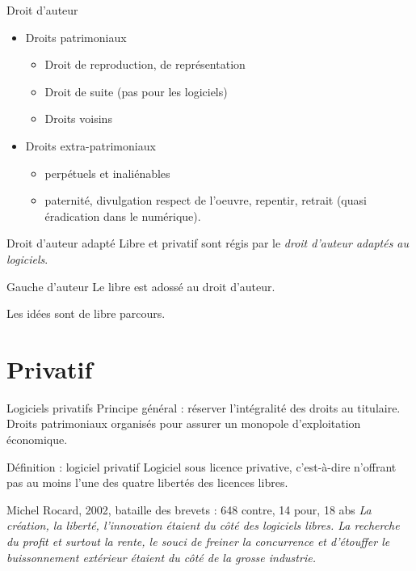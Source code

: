 \documentclass{beamer}
\begin{document}
\begin{frame}{Droit d'auteur}

  \begin{itemize}
  \item Droits patrimoniaux
    \begin{itemize}
    \item Droit de reproduction, de représentation
    \item Droit de suite (pas pour les logiciels)
    \item Droits voisins
    \end{itemize}
  \item Droits extra-patrimoniaux
    \begin{itemize}
    \item perpétuels et inaliénables
    \item paternité, divulgation  respect de l'oeuvre, repentir, retrait (quasi éradication dans le numérique).
    \end{itemize}
  \end{itemize}

 \begin{alertblock}{Droit d'auteur adapté}
    Libre et privatif sont régis par le \textit{droit d'auteur adaptés au logiciels}.
  \end{alertblock}

  \begin{alertblock}{Gauche d'auteur}
    Le libre est adossé au droit d'auteur.
  \end{alertblock}
  
  Les idées sont de libre parcours.
\end{frame}


\section{Privatif}


\begin{frame}{Logiciels privatifs}
  Principe général : réserver l'intégralité des droits au titulaire. Droits patrimoniaux organisés pour assurer un monopole d'exploitation économique.

  \begin{alertblock}{Définition : logiciel privatif}
    Logiciel sous licence privative, c'est-à-dire n'offrant pas au moins l'une des quatre libertés des licences libres.    
  \end{alertblock}

\pause

  \begin{block}{Michel Rocard, 2002, bataille des brevets : 648 contre, 14 pour, 18 abs}
   \textit{ La création, la liberté, l'innovation étaient du côté des logiciels libres. La recherche du profit et surtout la rente, le souci de freiner la concurrence et d'étouffer le buissonnement extérieur étaient du côté de la grosse industrie.
}
  \end{block}
\end{frame}
\end{document}
